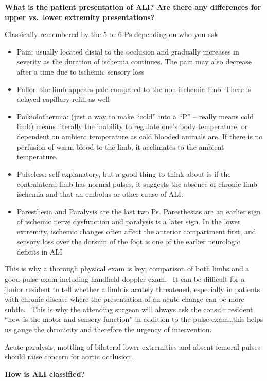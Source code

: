\documentclass[
]{book}
\begin{document}
\textbf{What is the patient presentation of ALI? Are there any differences for
upper vs.~lower extremity presentations?}

Classically remembered by the 5 or 6 Ps depending on who you ask

\begin{itemize}
\item
  Pain: usually located distal to the occlusion and gradually
  increases in severity as the duration of ischemia continues. The
  pain may also decrease after a time due to ischemic sensory loss
\item
  Pallor: the limb appears pale compared to the non ischemic limb.
  There is delayed capillary refill as well
\item
  Poikiolothermia: (just a way to make ``cold'' into a ``P'' -- really
  means cold limb) means literally the inability to regulate one's
  body temperature, or dependent on ambient temperature as cold
  blooded animals are. If there is no perfusion of warm blood to the
  limb, it acclimates to the ambient temperature.~
\item
  Pulseless: self explanatory, but a good thing to think about is if
  the contralateral limb has normal pulses, it suggests the absence of
  chronic limb ischemia and that an embolus or other cause of ALI.~
\item
  Paresthesia and Paralysis are the last two Ps. Paresthesias are an
  earlier sign of ischemic nerve dysfunction and paralysis is a later
  sign. In the lower extremity, ischemic changes often affect the
  anterior compartment first, and sensory loss over the dorsum of the
  foot is one of the earlier neurologic deficits in ALI
\end{itemize}

This is why a thorough physical exam is key; comparison of both limbs
and a good pulse exam including handheld doppler exam.~ It can be
difficult for a junior resident to tell whether a limb is acutely
threatened, especially in patients with chronic disease where the
presentation of an acute change can be more subtle.~ This is why the
attending surgeon will always ask the consult resident ``how is the motor
and sensory function'' in addition to the pulse exam\ldots this helps us
gauge the chronicity and therefore the urgency of intervention.

Acute paralysis, mottling of bilateral lower extremities and absent
femoral pulses should raise concern for aortic occlusion.\citep{wang2016}

\textbf{How is ALI classified?}
\end{document}
